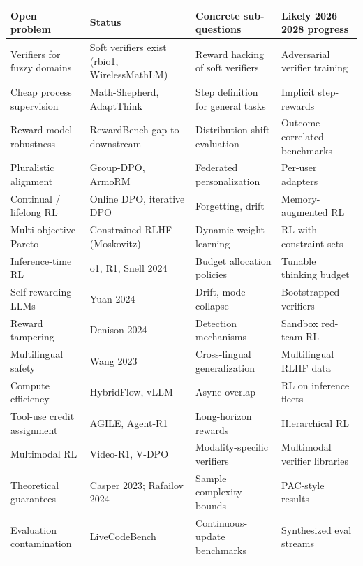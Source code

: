{\def\LTcaptype{none} %
\begin{longtable}[]{@{}
  >{\raggedright\arraybackslash}p{}
  >{\raggedright\arraybackslash}p{}
  >{\raggedright\arraybackslash}p{}
  >{\raggedright\arraybackslash}p{}@{}}
\toprule\noalign{}
\begin{minipage}[b]{\linewidth}\raggedright
Open problem
\end{minipage} & \begin{minipage}[b]{\linewidth}\raggedright
Status
\end{minipage} & \begin{minipage}[b]{\linewidth}\raggedright
Concrete sub-questions
\end{minipage} & \begin{minipage}[b]{\linewidth}\raggedright
Likely 2026--2028 progress
\end{minipage} \\
\midrule\noalign{}
\endhead
\bottomrule\noalign{}
\endlastfoot
Verifiers for fuzzy domains & Soft verifiers exist (rbio1, WirelessMathLM) & Reward hacking of soft verifiers & Adversarial verifier training \\
Cheap process supervision & Math-Shepherd, AdaptThink & Step definition for general tasks & Implicit step-rewards \\
Reward model robustness & RewardBench gap to downstream & Distribution-shift evaluation & Outcome-correlated benchmarks \\
Pluralistic alignment & Group-DPO, ArmoRM & Federated personalization & Per-user adapters \\
Continual / lifelong RL & Online DPO, iterative DPO & Forgetting, drift & Memory-augmented RL \\
Multi-objective Pareto & Constrained RLHF (Moskovitz) & Dynamic weight learning & RL with constraint sets \\
Inference-time RL & o1, R1, Snell 2024 & Budget allocation policies & Tunable thinking budget \\
Self-rewarding LLMs & Yuan 2024 & Drift, mode collapse & Bootstrapped verifiers \\
Reward tampering & Denison 2024 & Detection mechanisms & Sandbox red-team RL \\
Multilingual safety & Wang 2023 & Cross-lingual generalization & Multilingual RLHF data \\
Compute efficiency & HybridFlow, vLLM & Async overlap & RL on inference fleets \\
Tool-use credit assignment & AGILE, Agent-R1 & Long-horizon rewards & Hierarchical RL \\
Multimodal RL & Video-R1, V-DPO & Modality-specific verifiers & Multimodal verifier libraries \\
Theoretical guarantees & Casper 2023; Rafailov 2024 & Sample complexity bounds & PAC-style results \\
Evaluation contamination & LiveCodeBench & Continuous-update benchmarks & Synthesized eval streams \\
\end{longtable}
}

